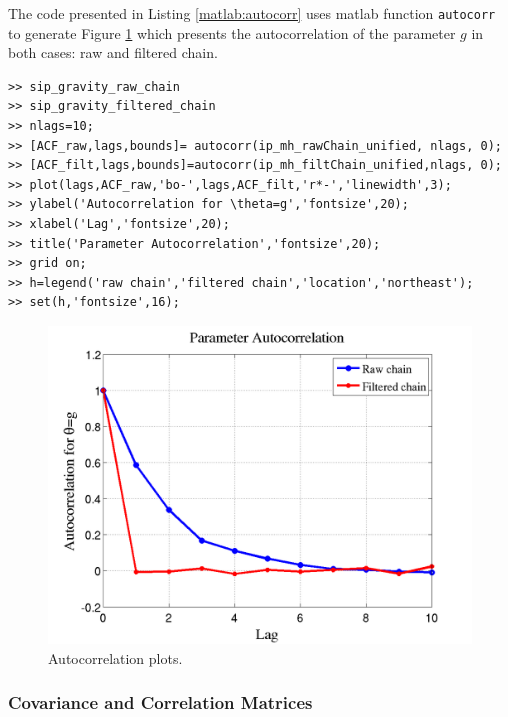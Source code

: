 The code presented in Listing \ref{matlab:autocorr} uses matlab function \verb+autocorr+ to generate Figure \ref{fig:sip_gravity_autocorrelation_raw_filt}
which presents the autocorrelation of the parameter $g$ in both cases: raw and filtered chain.

\begin{lstlisting}[label=matlab:autocorr,caption={Matlab code for the autocorrelation plots.}]
% inside Matlab
>> sip_gravity_raw_chain
>> sip_gravity_filtered_chain
>> nlags=10;
>> [ACF_raw,lags,bounds]= autocorr(ip_mh_rawChain_unified, nlags, 0);
>> [ACF_filt,lags,bounds]=autocorr(ip_mh_filtChain_unified,nlags, 0);
>> plot(lags,ACF_raw,'bo-',lags,ACF_filt,'r*-','linewidth',3);
>> ylabel('Autocorrelation for \theta=g','fontsize',20);
>> xlabel('Lag','fontsize',20);
>> title('Parameter Autocorrelation','fontsize',20);
>> grid on;
>> h=legend('raw chain','filtered chain','location','northeast');
>> set(h,'fontsize',16);
\end{lstlisting}

\begin{figure}[htpb]
\centering
\includegraphics[scale=0.40]{rawfigs/sip_gravity_autocorrelation_raw_filt.png}
\vspace{-8pt}
\caption{
Autocorrelation plots. }
\label{fig:sip_gravity_autocorrelation_raw_filt}
\end{figure}

\subsubsection{Covariance and Correlation Matrices}

